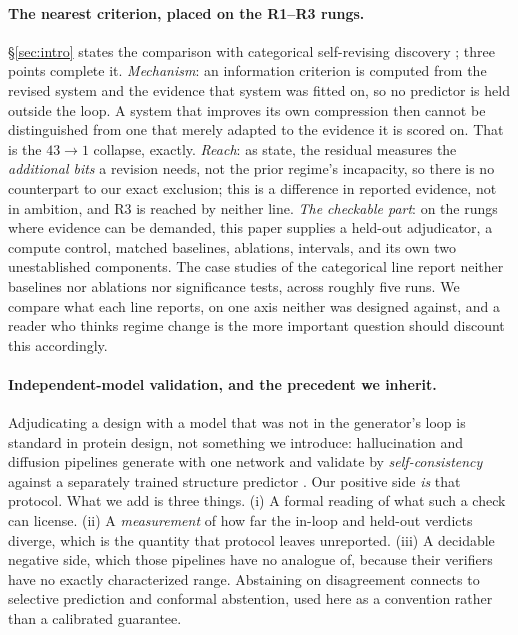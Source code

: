 \documentclass[11pt]{article}
\begin{document}
\paragraph{The nearest criterion, placed on the R1--R3 rungs.} \S\ref{sec:intro} states the comparison with
categorical self-revising discovery \citep{selfrevising}; three points complete it. \emph{Mechanism}: an information criterion is computed from the revised system and the evidence that system was
fitted on, so no predictor is held outside the loop. A system that improves its own compression then cannot be
distinguished from one that merely adapted to the evidence it is scored on. That is the $43\!\to\!1$ collapse,
exactly.
\emph{Reach}: as \citet{selfrevising} state, the residual measures the \emph{additional bits} a revision
needs, not the prior regime's incapacity, so there is no counterpart to our exact exclusion; this is a
difference in reported evidence, not in ambition, and R3 is reached by neither line. \emph{The checkable part}: on the rungs where evidence can be demanded, this paper supplies a held-out
adjudicator, a compute control, matched baselines, ablations, intervals, and its own two unestablished
components. The case studies of the categorical line report neither baselines nor ablations nor significance
tests, across roughly five runs.
We compare what each line reports, on one axis neither was designed against, and a reader who thinks regime
change is the more important question should discount this accordingly.

\paragraph{Independent-model validation, and the precedent we inherit.} Adjudicating a design with a model
that was not in the generator's loop is standard in protein design, not something we introduce: hallucination
and diffusion pipelines generate with one network and validate by \emph{self-consistency} against a separately
trained structure predictor \citep{anishchenko2021hallucination,watson2023rfdiffusion}. Our positive side
\emph{is} that protocol. What we add is three things. (i) A formal reading of what such a check can license. (ii) A \emph{measurement} of
how far the in-loop and held-out verdicts diverge, which is the quantity that protocol leaves unreported. (iii)
A decidable negative side, which those pipelines have no analogue of, because their verifiers have no exactly
characterized range. Abstaining on disagreement connects to selective prediction and
conformal abstention, used here as a convention rather than a calibrated guarantee.
\end{document}
